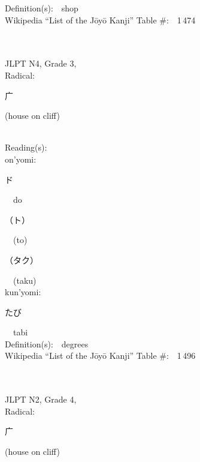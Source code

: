 \begin{multicols}{2}
Definition(s):\ \ shop \\
Wikipedia ``List of the J\=oy\=o Kanji'' Table \#:\ \ 1\,474 \\
\ \ \\
{\fontsize{34pt}{40pt}  }\ \ \\  %
{JLPT N4, Grade 3, \\Radical:\ \ {\begin{CJK}{UTF8}{min} 广 \end{CJK}} (house on cliff) } \\
Reading(s):\ \ \\
{\hspace*{1em}}on'yomi:\ \ \\
{\hspace*{2em}}{\begin{CJK}{UTF8}{min} ド \end{CJK}}\ \ do\ \ \\
{\hspace*{2em}}{\begin{CJK}{UTF8}{min} （ト） \end{CJK}}\ \ (to)\ \ \\
{\hspace*{2em}}{\begin{CJK}{UTF8}{min} （タク） \end{CJK}}\ \ (taku)\ \ \\
{\hspace*{1em}}kun'yomi:\ \ \\
{\hspace*{2em}}{\begin{CJK}{UTF8}{min} たび \end{CJK}}\ \ tabi\ \ \\
Definition(s):\ \ degrees \\
Wikipedia ``List of the J\=oy\=o Kanji'' Table \#:\ \ 1\,496 \\
\ \ \\
{\fontsize{34pt}{40pt}  }\ \ \\  %
{JLPT N2, Grade 4, \\Radical:\ \ {\begin{CJK}{UTF8}{min} 广 \end{CJK}} (house on cliff) } \\

\end{multicols}
